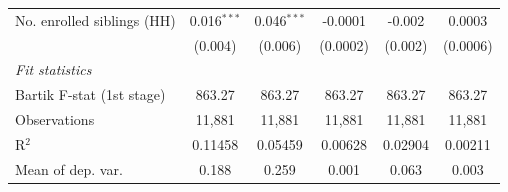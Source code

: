 \begin{tabular}{lccccc}
   No. enrolled siblings (HH)                                            & 0.016$^{***}$                        & 0.046$^{***}$                          & -0.0001                        & -0.002                            & 0.0003\\   
                                                                         & (0.004)                              & (0.006)                                & (0.0002)                       & (0.002)                           & (0.0006)\\   
   \midrule
   \emph{Fit statistics}\\
   Bartik F-stat (1st stage)                                     & 863.27                               & 863.27                                 & 863.27                         & 863.27                            & 863.27\\  
   Observations                                                          & 11,881                               & 11,881                                 & 11,881                         & 11,881                            & 11,881\\  
   R$^2$                                                                 & 0.11458                              & 0.05459                                & 0.00628                        & 0.02904                           & 0.00211\\  
   Mean of dep. var.                                                     & 0.188                                & 0.259                                  & 0.001                          & 0.063                             & 0.003\\  
\bottomrule
\end{tabular}
